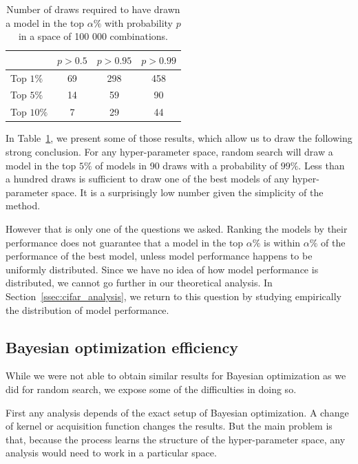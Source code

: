 \begin{table}[htb]
	\centering
	\begin{tabular}{ | l | c | c | c | }
		\hline
		 & $p > 0.5$ & $p > 0.95$ & $p > 0.99$ \\ 
		\hline
		Top $1 \%$ & 69 & 298 & 458 \\
		Top $5 \%$ & 14 & 59 & 90 \\
		Top $10 \%$ & 7 & 29 & 44 \\
		\hline
	\end{tabular}
	\caption[Theoretical performance of random search]{Number of draws required to have drawn a model in the top $\alpha \%$ with probability $p$ in a space of 100 000 combinations.}
	\label{table:random_search_bounds}
\end{table}

In Table~\ref{table:random_search_bounds}, we present some of those results, which allow us to draw the following strong conclusion. For any hyper-parameter space, random search will draw a model in the top $5 \%$ of models in 90 draws with a probability of $99 \%$. Less than a hundred draws is sufficient to draw one of the best models of any hyper-parameter space. It is a surprisingly low number given the simplicity of the method.

However that is only one of the questions we asked. Ranking the models by their performance does not guarantee that a model in the top $\alpha \%$ is within $\alpha \%$ of the performance of the best model, unless model performance happens to be uniformly distributed. Since we have no idea of how model performance is distributed, we cannot go further in our theoretical analysis. In Section~\ref{ssec:cifar_analysis}, we return to this question by studying empirically the distribution of model performance.

\subsection{Bayesian optimization efficiency}

While we were not able to obtain similar results for Bayesian optimization as we did for random search, we expose some of the difficulties in doing so.

First any analysis depends of the exact setup of Bayesian optimization. A change of kernel or acquisition function changes the results. But the main problem is that, because the process learns the structure of the hyper-parameter space, any analysis would need to work in a particular space.

